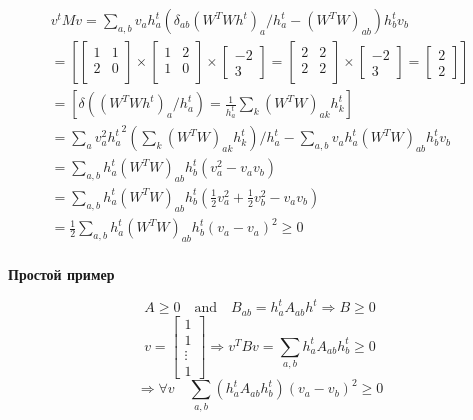 \documentclass[oneside, final, 12pt]{extarticle}
\begin{document}
\begin{multline}
  v^t M v =
  \sum_{a,b}v_a h_a^t (\delta_{ab}(W^TWh^t)_a / h_a^t
  -(W^TW)_{ab})h_b^t v_b \\
  =
  \left[
    \begin{bmatrix}1 & 1 \\ 2 & 0 \\ \end{bmatrix} \times
    \begin{bmatrix}1 & 2 \\ 1 & 0 \\ \end{bmatrix} \times
    \begin{bmatrix} -2 \\ 3 \end{bmatrix}
    =
      \begin{bmatrix}2 & 2 \\ 2 & 2 \\ \end{bmatrix} \times
      \begin{bmatrix} -2 \\ 3 \end{bmatrix} =
      \begin{bmatrix} 2 \\ 2 \end{bmatrix}
  \right] \\
  =
  \left[
    \delta((W^TWh^t)_a / h_a^t) =
    \frac{1}{h_a^t} \sum_k (W^TW)_{ak} h_k^t
  \right] \\
  =
  \sum_a v_a^2 {h_a^t}^2
    \left(\sum_k(W^TW)_{ak}h_k^t\right) /h_a^t -
    \sum_{a,b} v_ah_a^t(W^TW)_{ab}h_b^tv_b \\
  = \sum_{a,b}h_a^t(W^TW)_{ab}h_b^t(v_a^2 - v_av_b) \\
  = \sum_{a,b}h_a^t(W^TW)_{ab}h_b^t(
    \frac{1}{2}v_a^2 + \frac{1}{2}v_b^2 - v_av_b) \\
  = \frac{1}{2} \sum_{a,b}h_a^t(W^TW)_{ab}h_b^t(v_a - v_a)^2 \geqslant 0 \\
\end{multline}

\textbf{Простой пример}

\[
  A \geqslant 0 \quad \text{and} \quad
  B_{ab} = h_a^tA_{ab}h^t
  \Rightarrow B \geqslant 0
\]
\[
  v =
  \begin{bmatrix}
    1 \\ 1 \\ \vdots \\ 1
  \end{bmatrix} \Rightarrow
  v^TBv = \sum_{a,b} h_a^tA_{ab}h_b^t \geqslant 0
\]
\[
  \Rightarrow \forall v \quad
  \sum_{a,b}\left(h_a^tA_{ab}h_b^t\right) (v_a - v_b)^2 \geqslant 0
\]
\end{document}

